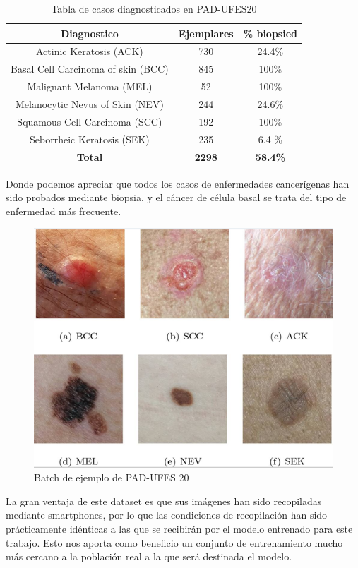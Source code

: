 \begin{table}[!ht]
	\centering
	\begin{tabular}{|c|c|c|}
		\hline
		\textbf{Diagnostico} & \textbf{Ejemplares} & \textbf{\% biopsied} \\ \hline
		Actinic Keratosis (ACK) & 730 & 24.4\% \\ \hline
		Basal Cell Carcinoma of skin (BCC) & 845 & 100\% \\ \hline
		Malignant Melanoma (MEL) & 52 & 100\% \\ \hline
		Melanocytic Nevus of Skin (NEV) & 244 & 24.6\% \\ \hline
		Squamous Cell Carcinoma (SCC) & 192 & 100\% \\ \hline
		Seborrheic Keratosis (SEK)	&235	&6.4 \% \\ \hline
		\textbf{Total} & \textbf{2298} & \textbf{58.4\%} \\ \hline
	\end{tabular}
	\caption{Tabla de casos diagnosticados en PAD-UFES20}
\end{table}

Donde podemos apreciar que todos los casos de enfermedades cancerígenas han sido probados mediante biopsia, y el cáncer de célula basal se trata del tipo de enfermedad más frecuente.
\begin{figure}[H]
	\centering
	\includegraphics[scale = 0.5]{imagenes/PAD-UFES.png}
	\caption{Batch de ejemplo de PAD-UFES 20 \cite{PACHECO2020106221}}
\end{figure}

La gran ventaja de este dataset es que sus imágenes han sido recopiladas mediante smartphones, por lo que las condiciones de recopilación han sido prácticamente idénticas a las que se recibirán por el modelo entrenado para este trabajo. Esto nos aporta como beneficio un conjunto de entrenamiento mucho más cercano a la población real a la que será destinada el modelo.

